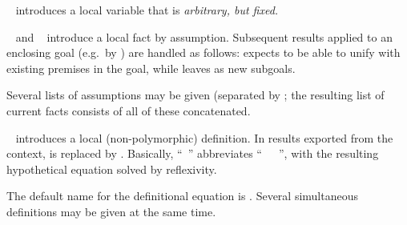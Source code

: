 \begin{isabellebody}
\begin{isamarkuptext}
  \begin{descr}
  
  \item [\mbox{\isa{\isacommand{fix}}}~\isa{x}] introduces a local variable
   that is \emph{arbitrary, but fixed.}
  
  \item [\mbox{\isa{\isacommand{assume}}}~\isa{a{\isacharcolon}\ {\isasymphi}} and \mbox{\isa{\isacommand{presume}}}~\isa{a{\isacharcolon}\ {\isasymphi}}] introduce a local fact \isa{{\isasymphi}\ {\isasymturnstile}\ {\isasymphi}} by
  assumption.  Subsequent results applied to an enclosing goal (e.g.\
  by \mbox{}) are handled as follows: \mbox{} expects to be able to unify with existing premises in the
  goal, while \mbox{\isa{\isacommand{presume}}} leaves \isa{{\isasymphi}} as new subgoals.
  
  Several lists of assumptions may be given (separated by
  \mbox{}; the resulting list of current facts consists
  of all of these concatenated.
  
  \item [\mbox{\isa{\isacommand{def}}}~\isa{x\ {\isasymequiv}\ t}] introduces a local
  (non-polymorphic) definition.  In results exported from the context,
  \isa{x} is replaced by \isa{t}.  Basically, ``\mbox{}~'' abbreviates ``\mbox{}~~\mbox{}~'', with the resulting
  hypothetical equation solved by reflexivity.
  
  The default name for the definitional equation is .
  Several simultaneous definitions may be given at the same time.

  \end{descr}


\end{isamarkuptext}
\end{isabellebody}
